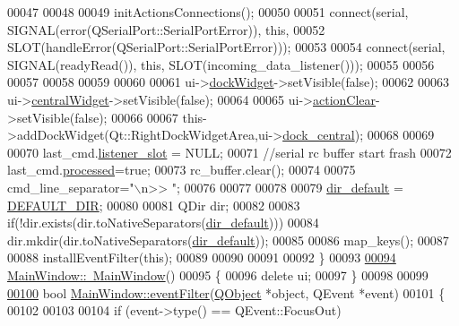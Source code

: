 \begin{DoxyCode}
00047 
00048 
00049           initActionsConnections();
00050 
00051             connect(serial, SIGNAL(error(QSerialPort::SerialPortError)), \textcolor{keyword}{this},
00052             SLOT(handleError(QSerialPort::SerialPortError)));
00053 
00054             connect(serial, SIGNAL(readyRead()), \textcolor{keyword}{this}, SLOT(incoming\_data\_listener()));
00055 
00056 
00057 
00058 
00059 
00060 
00061            ui->\hyperlink{a00080_ac8a083c4b66fb317a9b538409ce412e2}{dockWidget}->setVisible(\textcolor{keyword}{false});
00062 
00063            ui->\hyperlink{a00080_a30075506c2116c3ed4ff25e07ae75f81}{centralWidget}->setVisible(\textcolor{keyword}{false});
00064 
00065            ui->\hyperlink{a00080_ac8539dcd87955047877cb256aff60453}{actionClear}->setVisible(\textcolor{keyword}{false});
00066 
00067           this->addDockWidget(Qt::RightDockWidgetArea,ui->\hyperlink{a00080_a19105d0d919fa33b5f29f7677bbab054}{dock\_central});
00068 
00069 
00070           last\_cmd.\hyperlink{a00004_abb76d8edb39876deb60975c8fd784b3f}{listener\_slot} = NULL;
00071           \textcolor{comment}{//serial rc buffer start frash}
00072           last\_cmd.\hyperlink{a00004_a3e88f779da9798a5da7dda227e2ca388}{processed}=\textcolor{keyword}{true};
00073           rc\_buffer.clear();
00074 
00075           cmd\_line\_separator=\textcolor{stringliteral}{"\(\backslash\)n>> "};
00076 
00077 
00078 
00079           \hyperlink{a00017_a2e107e43aeaccaf4c9a42254f13122c8}{dir\_default} = \hyperlink{a00110_a63ec0cea9c1f0ca8a7893c2c53d2fd81}{DEFAULT\_DIR};
00080 
00081           QDir dir;
00082 
00083           \textcolor{keywordflow}{if}(!dir.exists(dir.toNativeSeparators(\hyperlink{a00017_a2e107e43aeaccaf4c9a42254f13122c8}{dir\_default})))
00084               dir.mkdir(dir.toNativeSeparators(\hyperlink{a00017_a2e107e43aeaccaf4c9a42254f13122c8}{dir\_default}));
00085 
00086           map\_keys();
00087 
00088           installEventFilter(\textcolor{keyword}{this});
00089 
00090 
00091 
00092 \}
00093 
\hypertarget{a00109_source_l00094}{}\hyperlink{a00017_ae98d00a93bc118200eeef9f9bba1dba7}{00094} \hyperlink{a00017_ae98d00a93bc118200eeef9f9bba1dba7}{MainWindow::~MainWindow}()
00095 \{
00096     \textcolor{keyword}{delete} ui;
00097 \}
00098 
00099 
\hypertarget{a00109_source_l00100}{}\hyperlink{a00017_a91df90bb5045775882c062cefdf903e9}{00100} \textcolor{keywordtype}{bool} \hyperlink{a00017_a91df90bb5045775882c062cefdf903e9}{MainWindow::eventFilter}(\hyperlink{a00059}{QObject} *\textcolor{keywordtype}{object}, QEvent *event)
00101 \{
00102 
00103 
00104     \textcolor{keywordflow}{if} (event->type() == QEvent::FocusOut)

\end{DoxyCode}
